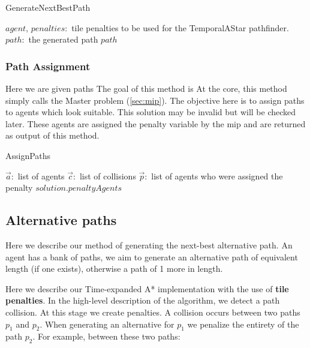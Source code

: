 \documentclass[a4paper,11pt]{article}
\let\oldReturn\Return
\renewcommand{\Return}{\State\oldReturn}
\begin{document}
\begin{algorithm}[H]
	\caption{GenerateNextBestPath}\label{alg:generate-paths}
	\begin{algorithmic}[1]
		\Require $agent$, $penalties:$ tile penalties to be used for the TemporalAStar pathfinder.
		\Ensure $path:$ the generated path
		\Else
		\EndIf
		\Return $path$
		\EndFor
	\end{algorithmic}
\end{algorithm}

\subsubsection{Path Assignment}
Here we are given paths
The goal of this method is 
At the core, this method simply calls the Master problem (\ref{sec:mip}). The objective here is to assign paths to agents which look suitable. This solution may be invalid but will be checked later. These agents are assigned the penalty variable by the mip and are returned as output of this method.

\begin{algorithm}[H]
	\caption{AssignPaths}\label{alg:assignPaths}
	\begin{algorithmic}[1]
		\Require $\vec{a}:$ list of agents $\vec{c}:$ list of collisions
		\Ensure $\vec{p}:$ list of agents who were assigned the penalty
		\EndFor 
		\Return $solution.penaltyAgents$
	\end{algorithmic}
\end{algorithm}

\subsection{Alternative paths} \label{sec:temporalastar}
Here we describe our method of generating the next-best alternative path. An agent has a bank of paths, we aim to generate an alternative path of equivalent length (if one exists), otherwise a path of 1 more in length.

Here we describe our Time-expanded A* implementation with the use of \textbf{tile penalties}. In the high-level description of the algorithm, we detect a path collision. At this stage we create penalties. A collision occurs between two paths $p_1$ and $p_2$. When generating an alternative for $p_1$ we penalize the entirety of the path $p_2$. For example, between these two paths:
\end{document}
